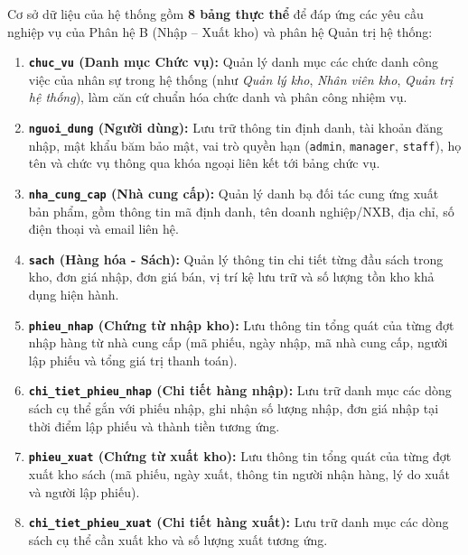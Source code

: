 \documentclass[12pt,a4paper]{article}
\begin{document}
Cơ sở dữ liệu của hệ thống gồm \textbf{8 bảng thực thể} để đáp ứng các yêu cầu nghiệp vụ của Phân hệ B (Nhập – Xuất kho) và phân hệ Quản trị hệ thống:
\begin{enumerate}
    \item \textbf{\texttt{chuc\_vu} (Danh mục Chức vụ):} Quản lý danh mục các chức danh công việc của nhân sự trong hệ thống (như \textit{Quản lý kho}, \textit{Nhân viên kho}, \textit{Quản trị hệ thống}), làm căn cứ chuẩn hóa chức danh và phân công nhiệm vụ.
    \item \textbf{\texttt{nguoi\_dung} (Người dùng):} Lưu trữ thông tin định danh, tài khoản đăng nhập, mật khẩu băm bảo mật, vai trò quyền hạn (\texttt{admin}, \texttt{manager}, \texttt{staff}), họ tên và chức vụ thông qua khóa ngoại liên kết tới bảng chức vụ.
    \item \textbf{\texttt{nha\_cung\_cap} (Nhà cung cấp):} Quản lý danh bạ đối tác cung ứng xuất bản phẩm, gồm thông tin mã định danh, tên doanh nghiệp/NXB, địa chỉ, số điện thoại và email liên hệ.
    \item \textbf{\texttt{sach} (Hàng hóa - Sách):} Quản lý thông tin chi tiết từng đầu sách trong kho, đơn giá nhập, đơn giá bán, vị trí kệ lưu trữ và số lượng tồn kho khả dụng hiện hành.
    \item \textbf{\texttt{phieu\_nhap} (Chứng từ nhập kho):} Lưu thông tin tổng quát của từng đợt nhập hàng từ nhà cung cấp (mã phiếu, ngày nhập, mã nhà cung cấp, người lập phiếu và tổng giá trị thanh toán).
    \item \textbf{\texttt{chi\_tiet\_phieu\_nhap} (Chi tiết hàng nhập):} Lưu trữ danh mục các dòng sách cụ thể gắn với phiếu nhập, ghi nhận số lượng nhập, đơn giá nhập tại thời điểm lập phiếu và thành tiền tương ứng.
    \item \textbf{\texttt{phieu\_xuat} (Chứng từ xuất kho):} Lưu thông tin tổng quát của từng đợt xuất kho sách (mã phiếu, ngày xuất, thông tin người nhận hàng, lý do xuất và người lập phiếu).
    \item \textbf{\texttt{chi\_tiet\_phieu\_xuat} (Chi tiết hàng xuất):} Lưu trữ danh mục các dòng sách cụ thể cần xuất kho và số lượng xuất tương ứng.
\end{enumerate}
\end{document}
